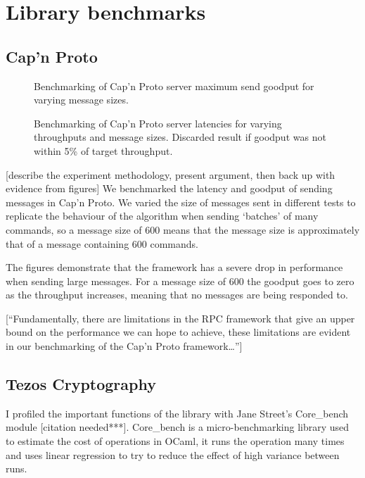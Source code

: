 \section{Library benchmarks} \label{librarybenchmarks}
\subsection{Cap'n Proto} \label{capnpbenchmark}

\begin{figure}[h!]
\centering

\caption{Benchmarking of Cap'n Proto server maximum send goodput for varying message sizes.}
\end{figure}

\begin{figure}[h!]
\centering

\caption{Benchmarking of Cap'n Proto server latencies for varying throughputs and message sizes. Discarded result if goodput was not within 5\% of target throughput.}
\end{figure}

[describe the experiment methodology, present argument, then back up with evidence from figures]
We benchmarked the latency and goodput of sending messages in Cap'n Proto. We varied the size of messages sent in different tests to replicate the behaviour of the algorithm when sending `batches' of many commands, so a message size of 600 means that the message size is approximately that of a message containing 600 commands.

The figures demonstrate that the framework has a severe drop in performance when sending large messages. For a message size of 600 the goodput goes to zero as the throughput increases, meaning that no messages are being responded to.

[``Fundamentally, there are limitations in the RPC framework that give an upper bound on the performance we can hope to achieve, these limitations are evident in our benchmarking of the Cap'n Proto framework\dots'']

\subsection{Tezos Cryptography} \label{tezosbenchmark}
I profiled the important functions of the library with Jane Street's Core\_bench module [citation needed***]. Core\_bench is a micro-benchmarking library used to estimate the cost of operations in OCaml, it runs the operation many times and uses linear regression to try to reduce the effect of high variance between runs.

